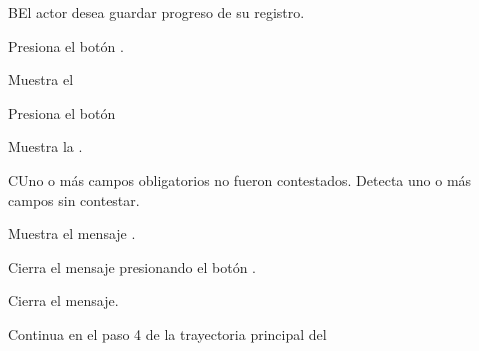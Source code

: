 
\begin{UCtrayectoriaA}{B}{El actor desea guardar progreso de su registro.}

\UCpaso[\UCactor] Presiona el botón .

\UCpaso Muestra el 

\UCpaso[\UCactor] Presiona el botón 

\UCpaso Muestra la .

\end{UCtrayectoriaA}


\begin{UCtrayectoriaA}{C}{Uno o más campos obligatorios no fueron contestados.}
    \UCpaso Detecta uno o más campos sin contestar.
    
    \UCpaso Muestra el mensaje .
    
    \UCpaso[\UCactor] Cierra el mensaje presionando el botón .

    \UCpaso Cierra el mensaje.
    
    \UCpaso Continua en el paso 4 de la trayectoria principal del 
\end{UCtrayectoriaA}